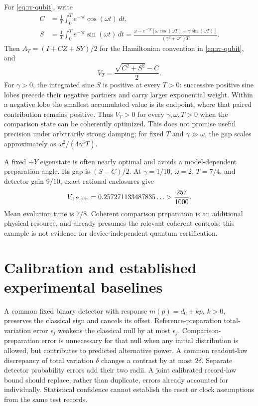 For \eqref{eq:rr-qubit}, write
\begin{align*}
 C&=\frac1T\int_0^T e^{-\gamma t}\cos(\omega t)\,dt,\\
 S&=\frac1T\int_0^T e^{-\gamma t}\sin(\omega t)\,dt
 =\frac{\omega-e^{-\gamma T}
 [\omega\cos(\omega T)+\gamma\sin(\omega T)]}
 {(\gamma^2+\omega^2)T}.
\end{align*}
Then $A_T=(I+C Z+S Y)/2$ for the Hamiltonian convention in
\eqref{eq:rr-qubit}, and
\[
 V_T=\frac{\sqrt{C^2+S^2}-C}{2}.
\]
For $\gamma>0$, the integrated sine $S$ is positive at every $T>0$: successive
positive sine lobes precede their negative partners and carry larger exponential
weight.  Within a negative lobe the smallest accumulated value is its endpoint,
where that paired contribution remains positive.  Thus $V_T>0$ for every
$\gamma,\omega,T>0$ when the comparison state can be coherently optimized.
This does not promise useful precision under arbitrarily strong damping;
for fixed $T$ and $\gamma\gg\omega$, the gap scales approximately as
$\omega^2/(4\gamma^3T)$.

A fixed $+Y$ eigenstate is often nearly optimal and avoids a model-dependent
preparation angle.  Its gap is $(S-C)/2$.  At $\gamma=1/10$, $\omega=2$,
$T=7/4$, and detector gain $9/10$, exact rational enclosures give
\[
 V_{+Y,\rm obs}=0.257271133487835\ldots>\frac{257}{1000}.
\]
Mean evolution time is $7/8$.  Coherent comparison preparation is an additional
physical resource, and already presumes the relevant coherent controls; this
example is not evidence for device-independent quantum certification.

\section{Calibration and established experimental baselines}
\label{sec:rr-comparison}

A common fixed binary detector with response $m(p)=d_0+k p$, $k>0$, preserves
the classical sign and cancels its offset.  Reference-preparation total-variation
error $\epsilon_j$ weakens the classical null by at most $\epsilon_j$.
Comparison-preparation error is unnecessary for that null when any initial
distribution is allowed, but contributes to predicted alternative power.
A common readout-law discrepancy of total variation $\delta$ changes a contrast
by at most $2\delta$.  Separate detector probability errors add their two radii.
A joint calibrated record-law bound should replace, rather than duplicate,
errors already accounted for individually.  Statistical confidence cannot
establish the reset or clock assumptions from the same test records.

